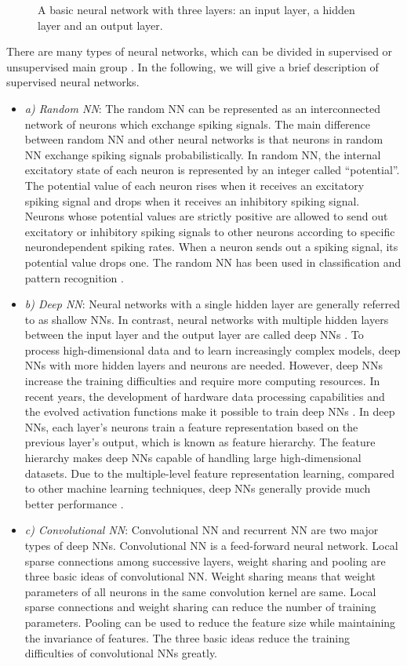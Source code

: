 \begin{itemize}
\begin{itemize}
\begin{figure}[tb!]
	\caption{A basic neural network with three layers: an input layer, a hidden layer and an output layer.}
	\label{fig:{NN_base}}
\end{figure}
There are many types of neural networks, which can be divided in supervised or unsupervised main group \cite{Lee2005}. In the following, we will give a brief description of supervised neural networks.
\begin{itemize}
\item[]\textit{a)	Random NN}: The random NN can be represented as an interconnected network of neurons which exchange spiking signals. The main difference between random NN and other neural networks is that neurons in random NN exchange spiking signals probabilistically. In random NN, the internal excitatory state of each neuron is represented by an integer called “potential”. The potential value of each neuron rises when it receives an excitatory spiking signal and drops when it receives an inhibitory spiking signal. Neurons whose potential values are strictly positive are allowed to send out excitatory or inhibitory spiking signals to other neurons according to specific neurondependent spiking rates. When a neuron sends out a spiking signal, its potential value drops one. The random NN has been used in classification and pattern recognition \cite{Timotheou2010}.
\item[]\textit{b)	Deep NN}: Neural networks with a single hidden layer are generally referred to as shallow NNs. In contrast, neural networks with multiple hidden layers between the input layer and the output layer are called deep NNs \cite{LeCun2015, Schmidhuber2015}. To process high-dimensional data and to learn increasingly complex models, deep NNs with more hidden layers and neurons are needed. However, deep NNs increase the training difficulties and require more computing resources. In recent years, the development of hardware data processing capabilities and the evolved activation functions make it possible to train deep NNs \cite{Pandey2014}. In deep NNs, each layer’s neurons train a feature representation based on the previous layer’s output, which is known as feature hierarchy. The feature hierarchy makes deep NNs capable of handling large high-dimensional datasets. Due to the multiple-level feature representation learning, compared to other machine learning techniques, deep NNs generally provide much better performance \cite{Pandey2014}.
\item[]\textit{c)	Convolutional NN}: Convolutional NN and recurrent NN are two major types of deep NNs. Convolutional NN \cite{Krizhevsky2012, Li2018} is a feed-forward neural network. Local sparse connections among successive layers, weight sharing and pooling are three basic ideas of convolutional NN. Weight sharing means that weight parameters of all neurons in the same convolution kernel are same. Local sparse connections and weight sharing can reduce the number of training parameters. Pooling can be used to reduce the feature size while maintaining the invariance of features. The three basic ideas reduce the training difficulties of convolutional NNs greatly.

\end{itemize}
\end{itemize}
\end{itemize}

